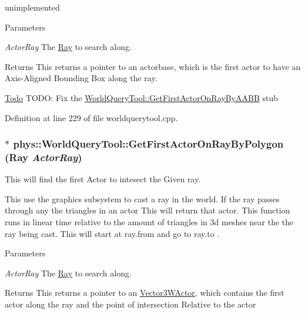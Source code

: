 unimplemented 


\begin{DoxyParams}{Parameters}
\item[{\em ActorRay}]The \hyperlink{classphys_1_1Ray}{Ray} to search along. \end{DoxyParams}
\begin{DoxyReturn}{Returns}
This returns a pointer to an actorbase, which is the first actor to have an Axis-\/Aligned Bounding Box along the ray. 
\end{DoxyReturn}


\begin{Desc}
\item[\hyperlink{todo__todo000024}{Todo}]TODO: Fix the \hyperlink{classphys_1_1WorldQueryTool_a67575416c2e9c652bbd873649ee38baf}{WorldQueryTool::GetFirstActorOnRayByAABB} stub \end{Desc}




Definition at line 229 of file worldquerytool.cpp.

\hypertarget{classphys_1_1WorldQueryTool_a256022003d64756b0b5c5706aefd5139}{
\subsubsection[{GetFirstActorOnRayByPolygon}]{ $\ast$ phys::WorldQueryTool::GetFirstActorOnRayByPolygon ({\bf Ray} {\em ActorRay})}}
\label{d8/d69/classphys_1_1WorldQueryTool_a256022003d64756b0b5c5706aefd5139}


This will find the first Actor to intesect the Given ray. 

This use the graphics subsystem to cast a ray in the world. If the ray passes through any the triangles in an actor This will return that actor. This function runs in linear time relative to the amount of triangles in 3d meshes near the the ray being cast. This will start at ray.from and go to ray.to . 
\begin{DoxyParams}{Parameters}
\item[{\em ActorRay}]The \hyperlink{classphys_1_1Ray}{Ray} to search along. \end{DoxyParams}
\begin{DoxyReturn}{Returns}
This returns a pointer to an \hyperlink{classphys_1_1Vector3WActor}{Vector3WActor}, which contains the first actor along the ray and the point of intersection Relative to the actor 
\end{DoxyReturn}


